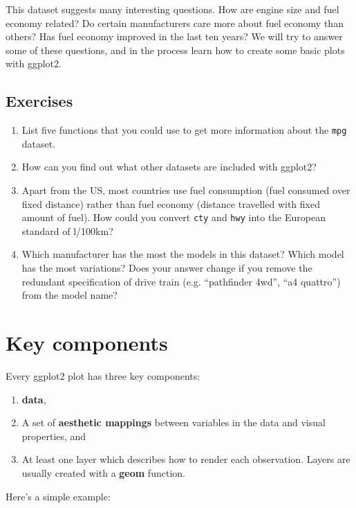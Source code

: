 This dataset suggests many interesting questions. How are engine size
and fuel economy related? Do certain manufacturers care more about fuel
economy than others? Has fuel economy improved in the last ten years? We
will try to answer some of these questions, and in the process learn how
to create some basic plots with ggplot2.

\subsection{Exercises}\label{exercises}

\begin{enumerate}
\def\labelenumi{\arabic{enumi}.}
\item
  List five functions that you could use to get more information about
  the \texttt{mpg} dataset.
\item
  How can you find out what other datasets are included with ggplot2?
\item
  Apart from the US, most countries use fuel consumption (fuel consumed
  over fixed distance) rather than fuel economy (distance travelled with
  fixed amount of fuel). How could you convert \texttt{cty} and
  \texttt{hwy} into the European standard of l/100km?
\item
  Which manufacturer has the most the models in this dataset? Which
  model has the most variations? Does your answer change if you remove
  the redundant specification of drive train (e.g. ``pathfinder 4wd'',
  ``a4 quattro'') from the model name?
\end{enumerate}

\hypertarget{sec:basic-use}{\section{Key
components}\label{sec:basic-use}}

Every ggplot2 plot has three key components:

\begin{enumerate}
\def\labelenumi{\arabic{enumi}.}
\item
  \textbf{data},
\item
  A set of \textbf{aesthetic mappings} between variables in the data and
  visual properties, and
\item
  At least one layer which describes how to render each observation.
  Layers are usually created with a \textbf{geom} function.
\end{enumerate}

Here's a simple example:  

